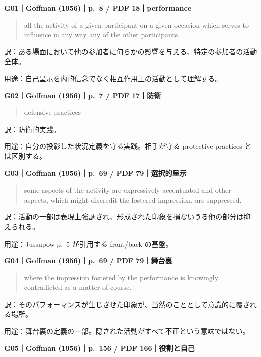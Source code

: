 \documentclass[
  11pt,
  a4paper,
]{article}
\begin{document}

\textbf{G01｜Goffman (1956)｜p.~8 / PDF 18｜performance}

\begin{quote}
all the activity of a given participant on a given occasion which serves
to influence in any way any of the other participants.
\end{quote}

訳：ある場面において他の参加者に何らかの影響を与える、特定の参加者の活動全体。

用途：自己呈示を内的信念でなく相互作用上の活動として理解する。


\textbf{G02｜Goffman (1956)｜p.~7 / PDF 17｜防衛}

\begin{quote}
defensive practices
\end{quote}

訳：防衛的実践。

用途：自分の投影した状況定義を守る実践。相手が守る protective practices
とは区別する。


\textbf{G03｜Goffman (1956)｜p.~69 / PDF 79｜選択的呈示}

\begin{quote}
some aspects of the activity are expressively accentuated and other
aspects, which might discredit the fostered impression, are suppressed.
\end{quote}

訳：活動の一部は表現上強調され、形成された印象を損ないうる他の部分は抑えられる。

用途：Jussupow p.~5 が引用する front/back の基盤。


\textbf{G04｜Goffman (1956)｜p.~69 / PDF 79｜舞台裏}

\begin{quote}
where the impression fostered by the performance is knowingly
contradicted as a matter of course.
\end{quote}

訳：そのパフォーマンスが生じさせた印象が、当然のこととして意識的に覆される場所。

用途：舞台裏の定義の一部。隠された活動がすべて不正という意味ではない。


\textbf{G05｜Goffman (1956)｜p.~156 / PDF 166｜役割と自己}
\end{document}
